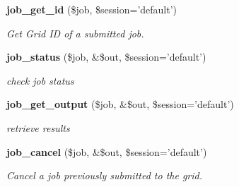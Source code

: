 \begin{CompactItemize}
{\bf job\_\-get\_\-id} (\$job, \$session='default')
\begin{CompactList}\small\item\em Get Grid ID of a submitted job. \item\end{CompactList}\item 
{\bf job\_\-status} (\$job, \&\$out, \$session='default')
\begin{CompactList}\small\item\em check job status \item\end{CompactList}\item 
{\bf job\_\-get\_\-output} (\$job, \&\$out, \$session='default')
\begin{CompactList}\small\item\em retrieve results \item\end{CompactList}\item 
{\bf job\_\-cancel} (\$job, \&\$out, \$session='default')
\begin{CompactList}\small\item\em Cancel a job previously submitted to the grid. \item\end{CompactList}\end{CompactItemize}

